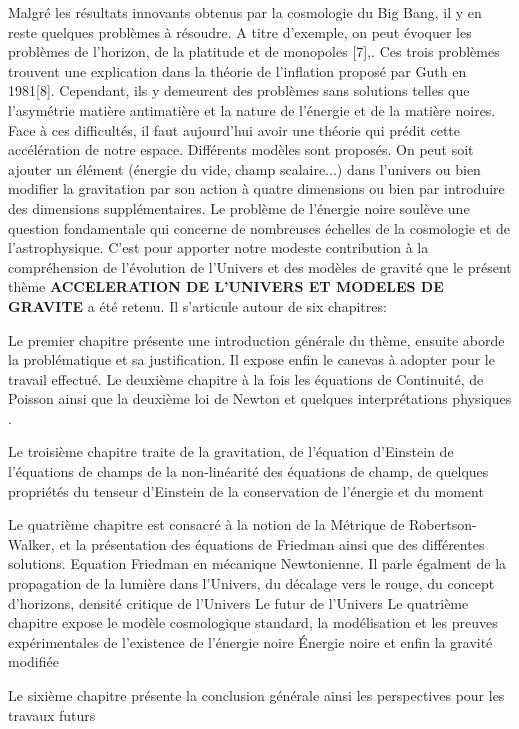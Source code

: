 \documentclass[a4paper,12pt]{report}
\theoremstyle{plain}
\theoremstyle{plain}
\begin{document}
Malgré les résultats innovants obtenus par la cosmologie du Big Bang, il y en reste quelques problèmes à résoudre. A titre d’exemple, on peut évoquer  les problèmes de l’horizon, de la platitude et de monopoles [7],. Ces trois problèmes
trouvent une explication dans la théorie de l’inflation proposé par Guth en 1981[8]. Cependant, ils y demeurent des problèmes sans solutions telles que l’asymétrie matière antimatière et la nature de l’énergie et de la matière
noires.	Face à ces difficultés, il faut aujourd'hui avoir une théorie qui prédit cette accélération de notre espace. Différents modèles sont proposés. On peut soit ajouter un élément (énergie du vide, champ scalaire...) dans l'univers ou bien modifier la gravitation par son action à quatre dimensions ou bien par introduire des	dimensions supplémentaires. Le problème de l'énergie noire soulève une question fondamentale qui concerne de nombreuses échelles de la cosmologie et de l'astrophysique. C'est pour apporter notre modeste contribution à la compréhension de l'évolution de l'Univers et des modèles de gravité que le présent thème \textbf{ACCELERATION DE L'UNIVERS ET MODELES DE GRAVITE} a été retenu. Il s'articule autour de six chapitres:

Le premier chapitre présente une introduction générale du thème, ensuite aborde la problématique et sa justification. Il expose enfin le canevas à adopter pour le travail effectué.
Le deuxième chapitre 
à la fois les équations de Continuité, de Poisson ainsi que la deuxième loi de Newton et quelques  interprétations physiques . 



Le troisième chapitre  traite de la gravitation,  de l'équation d’Einstein 
de l'équations de champs de la non-linéarité des équations de champ, de quelques  propriétés du tenseur d’Einstein de la conservation de l’énergie et du moment

Le quatrième chapitre est consacré à la notion de la Métrique de Robertson-Walker, et la présentation des équations de Friedman ainsi que des différentes solutions. Equation Friedman
en mécanique Newtonienne. Il parle égalment de la  propagation de la lumière dans l’Univers, du décalage vers le
rouge, du concept d'horizons, densité critique de l’Univers  Le futur de l’Univers 
Le quatrième chapitre expose le modèle cosmologique standard, la modélisation et les  preuves expérimentales de l’existence de
l’énergie noire  
Énergie noire et enfin la  gravité modifiée  

Le sixième chapitre présente la conclusion générale ainsi les   perspectives pour les travaux futurs
\end{document}
